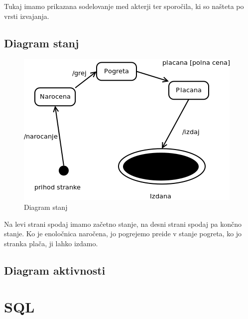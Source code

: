 \documentclass[12pt]{article}
\let\stdsection\section
\renewcommand\section{\newpage\stdsection}
\begin{document}
Tukaj imamo prikazana sodelovanje med akterji ter sporočila, ki so našteta po vrsti izvajanja.

\newpage

\subsection{Diagram stanj}

\begin{figure}[htb]
\begin{center}
\includegraphics[scale=0.5]{stanj.png}
\end{center}
\caption{Diagram stanj}
\label{stanj}
\end{figure}

Na levi strani spodaj imamo začetno stanje, na desni strani spodaj pa končno stanje. Ko je enoločnica naročena,
jo pogrejemo preide v stanje pogreta, ko jo stranka plača, ji lahko izdamo.



\newpage

\subsection{Diagram aktivnosti}




\newpage

\section{SQL}
\end{document}
